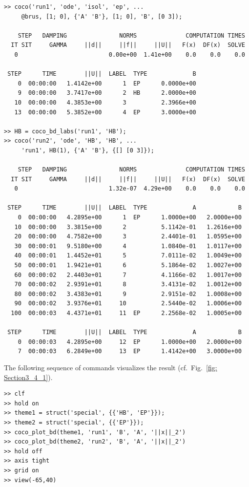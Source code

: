 \begin{lstlisting}[language=coco-highlight,frame=lines]
>> coco('run1', 'ode', 'isol', 'ep', ...
     @brus, [1; 0], {'A' 'B'}, [1; 0], 'B', [0 3]);

    STEP   DAMPING               NORMS              COMPUTATION TIMES
  IT SIT     GAMMA     ||d||     ||f||     ||U||   F(x)  DF(x)  SOLVE
   0                          0.00e+00  1.41e+00    0.0    0.0    0.0

 STEP      TIME        ||U||  LABEL  TYPE             B
    0  00:00:00   1.4142e+00      1  EP      0.0000e+00
    9  00:00:00   3.7417e+00      2  HB      2.0000e+00
   10  00:00:00   4.3853e+00      3          2.3966e+00
   13  00:00:00   5.3852e+00      4  EP      3.0000e+00

>> HB = coco_bd_labs('run1', 'HB');
>> coco('run2', 'ode', 'HB', 'HB', ...
     'run1', HB(1), {'A' 'B'}, {[] [0 3]});

    STEP   DAMPING               NORMS              COMPUTATION TIMES
  IT SIT     GAMMA     ||d||     ||f||     ||U||   F(x)  DF(x)  SOLVE
   0                          1.32e-07  4.29e+00    0.0    0.0    0.0

 STEP      TIME        ||U||  LABEL  TYPE             A            B
    0  00:00:00   4.2895e+00      1  EP      1.0000e+00   2.0000e+00
   10  00:00:00   3.3815e+00      2          5.1142e-01   1.2616e+00
   20  00:00:00   4.7582e+00      3          2.4401e-01   1.0595e+00
   30  00:00:01   9.5180e+00      4          1.0840e-01   1.0117e+00
   40  00:00:01   1.4452e+01      5          7.0111e-02   1.0049e+00
   50  00:00:01   1.9421e+01      6          5.1864e-02   1.0027e+00
   60  00:00:02   2.4403e+01      7          4.1166e-02   1.0017e+00
   70  00:00:02   2.9391e+01      8          3.4131e-02   1.0012e+00
   80  00:00:02   3.4383e+01      9          2.9151e-02   1.0008e+00
   90  00:00:02   3.9376e+01     10          2.5440e-02   1.0006e+00
  100  00:00:03   4.4371e+01     11  EP      2.2568e-02   1.0005e+00

 STEP      TIME        ||U||  LABEL  TYPE             A            B
    0  00:00:03   4.2895e+00     12  EP      1.0000e+00   2.0000e+00
    7  00:00:03   6.2849e+00     13  EP      1.4142e+00   3.0000e+00
\end{lstlisting}
The following sequence of commands visualizes the result (cf.\ Fig.~\ref{fig: Section3_4_1}).
\begin{lstlisting}[language=coco-highlight,frame=lines]
>> clf
>> hold on
>> theme1 = struct('special', {{'HB', 'EP'}});
>> theme2 = struct('special', {{'EP'}});
>> coco_plot_bd(theme1, 'run1', 'B', 'A', '||x||_2')
>> coco_plot_bd(theme2, 'run2', 'B', 'A', '||x||_2')
>> hold off
>> axis tight
>> grid on
>> view(-65,40)
\end{lstlisting}
